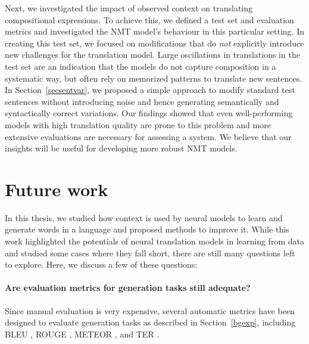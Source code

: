 \begin{enumerate}[label=\textbf{Research Question \arabic*:},ref={RQ\arabic*},wide = 0pt]
Next, we investigated the impact of observed context on translating compositional expressions.
To achieve this, we defined a test set and evaluation metrics and investigated the NMT model's behaviour in this particular setting. 
In creating this test set, we focused on modifications that do \textit{not} explicitly introduce new challenges for the translation model. 
Large oscillations in translations in the test set are an indication that the models do not capture composition in a systematic way, but often rely on memorized patterns to translate new sentences.
In Section~\ref{secsentvar}, we proposed a simple approach to modify standard test sentences without introducing noise and hence generating semantically and syntactically correct variations.
Our findings showed that even well-performing models with high translation quality are prone to this problem and more extensive evaluations are necessary for assessing a system. 
We believe that our insights will be useful for developing more robust NMT models. 


\end{enumerate}

\section{Future work}

In this thesis, we studied how context is used by neural models to learn and generate words in a language and proposed methods to improve it.
While this work highlighted the potentials of neural translation models in learning from data and studied some cases where they fall short, there are still many questions left to explore.
Here, we discuss a few of these questions:

 \paragraph{Are evaluation metrics for generation tasks still adequate?}
 
 
 Since manual evaluation is very expensive, several automatic metrics have been designed to evaluate generation tasks as described in Section~\ref{bgexp}, including BLEU \citep{Papineni2001}, ROUGE \citep{lin-2004-rouge}, METEOR \citep{banerjee-lavie-2005-meteor}, and TER \citep{Snover06astudy}.

